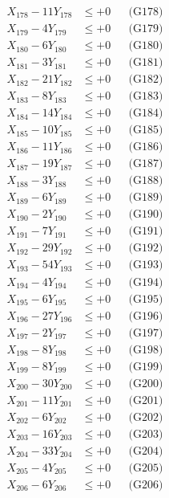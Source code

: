 \documentclass[a4paper,10pt]{article}
\begin{document}
{\begin{align}
X_{178} - 11Y_{178} &\leq +0 && \text{(G178)} \\
X_{179} - 4Y_{179} &\leq +0 && \text{(G179)} \\
X_{180} - 6Y_{180} &\leq +0 && \text{(G180)} \\
X_{181} - 3Y_{181} &\leq +0 && \text{(G181)} \\
X_{182} - 21Y_{182} &\leq +0 && \text{(G182)} \\
X_{183} - 8Y_{183} &\leq +0 && \text{(G183)} \\
\allowbreak
X_{184} - 14Y_{184} &\leq +0 && \text{(G184)} \\
X_{185} - 10Y_{185} &\leq +0 && \text{(G185)} \\
X_{186} - 11Y_{186} &\leq +0 && \text{(G186)} \\
X_{187} - 19Y_{187} &\leq +0 && \text{(G187)} \\
X_{188} - 3Y_{188} &\leq +0 && \text{(G188)} \\
X_{189} - 6Y_{189} &\leq +0 && \text{(G189)} \\
X_{190} - 2Y_{190} &\leq +0 && \text{(G190)} \\
X_{191} - 7Y_{191} &\leq +0 && \text{(G191)} \\
X_{192} - 29Y_{192} &\leq +0 && \text{(G192)} \\
X_{193} - 54Y_{193} &\leq +0 && \text{(G193)} \\
\allowbreak
X_{194} - 4Y_{194} &\leq +0 && \text{(G194)} \\
X_{195} - 6Y_{195} &\leq +0 && \text{(G195)} \\
X_{196} - 27Y_{196} &\leq +0 && \text{(G196)} \\
X_{197} - 2Y_{197} &\leq +0 && \text{(G197)} \\
X_{198} - 8Y_{198} &\leq +0 && \text{(G198)} \\
X_{199} - 8Y_{199} &\leq +0 && \text{(G199)} \\
X_{200} - 30Y_{200} &\leq +0 && \text{(G200)} \\
X_{201} - 11Y_{201} &\leq +0 && \text{(G201)} \\
X_{202} - 6Y_{202} &\leq +0 && \text{(G202)} \\
X_{203} - 16Y_{203} &\leq +0 && \text{(G203)} \\
\allowbreak
X_{204} - 33Y_{204} &\leq +0 && \text{(G204)} \\
X_{205} - 4Y_{205} &\leq +0 && \text{(G205)} \\
X_{206} - 6Y_{206} &\leq +0 && \text{(G206)} \\

\end{align}}
\end{document}
